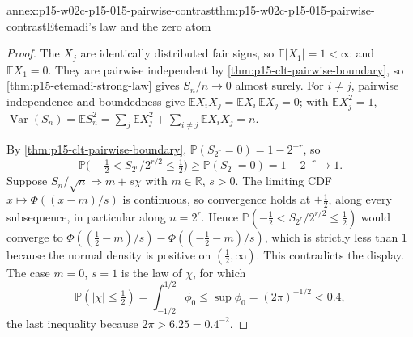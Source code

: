 \begin{annexitem}{annex:p15-w02c-p15-015-pairwise-contrast}{thm:p15-w02c-p15-015-pairwise-contrast}{Etemadi's law and the zero atom}
\begin{proof}
The \(X_j\) are identically distributed fair signs, so
\(\mathbb E|X_1|=1<\infty\) and \(\mathbb EX_1=0\). They are pairwise
independent by \cref{thm:p15-clt-pairwise-boundary}, so
\cref{thm:p15-etemadi-strong-law} gives \(S_n/n\to0\) almost surely.
For \(i\ne j\), pairwise independence and boundedness give
\(\mathbb EX_iX_j=\mathbb EX_i\,\mathbb EX_j=0\); with
\(\mathbb EX_j^2=1\),
\(\operatorname{Var}(S_n)=\mathbb ES_n^2=\sum_j\mathbb EX_j^2
+\sum_{i\ne j}\mathbb EX_iX_j=n\).

By \cref{thm:p15-clt-pairwise-boundary},
\(\mathbb P(S_{2^r}=0)=1-2^{-r}\), so
\[
 \mathbb P\bigl(-\tfrac12<S_{2^r}/2^{r/2}\leq\tfrac12\bigr)
   \geq\mathbb P(S_{2^r}=0)=1-2^{-r}\longrightarrow1 .
\]
Suppose \(S_n/\sqrt n\Rightarrow m+s\chi\) with \(m\in\mathbb R\),
\(s>0\). The limiting CDF \(x\mapsto\Phi((x-m)/s)\) is continuous, so
convergence holds at \(\pm\frac12\), along every subsequence, in
particular along \(n=2^r\). Hence
\(\mathbb P(-\frac12<S_{2^r}/2^{r/2}\leq\frac12)\) would converge to
\(\Phi((\frac12-m)/s)-\Phi((-\frac12-m)/s)\), which is strictly less than
\(1\) because the normal density is positive on \((\frac12,\infty)\).
This contradicts the display. The case \(m=0\), \(s=1\) is the law of
\(\chi\), for which
\[
 \mathbb P(|\chi|\leq\tfrac12)=\int_{-1/2}^{1/2}\phi_0
   \leq\sup\phi_0=(2\pi)^{-1/2}<0.4,
\]
the last inequality because \(2\pi>6.25=0.4^{-2}\).
\end{proof}
\end{annexitem}

